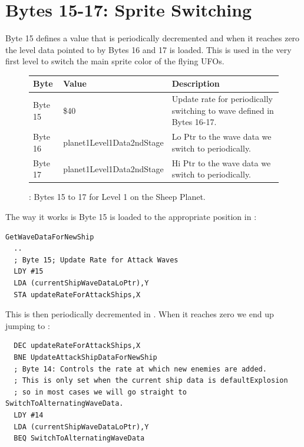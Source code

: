 \section{Bytes 15-17: Sprite Switching}
Byte 15 defines a value that is periodically decremented and when it reaches zero the level data pointed
to by Bytes 16 and 17 is loaded. This is used in the very first level to switch the main sprite color
of the flying UFOs. 

\begin{figure}[H]

  {
    \setlength{\tabcolsep}{3.0pt}
    \setlength\cmidrulewidth{\heavyrulewidth} %
    \begin{adjustbox}{width=13cm}

      \begin{tabular}{lll}
        \toprule
        Byte    & Value                     & Description                                                        \\
        \midrule
Byte 15 & \$40                       & Update rate for periodically switching to wave defined in Bytes 16-17. \\
 Byte 16 & planet1Level1Data2ndStage & Lo Ptr to the wave data we switch to periodically.               \\
 Byte 17 & planet1Level1Data2ndStage & Hi Ptr to the wave data we switch to periodically.               \\
        \bottomrule
      \end{tabular}
    \end{adjustbox}
  }\caption{: Bytes 15 to 17 for Level 1 on the Sheep Planet.}
\end{figure}

The way it works is Byte 15 is loaded to the appropriate position in :

\begin{lstlisting}
GetWaveDataForNewShip
  ..
  ; Byte 15; Update Rate for Attack Waves
  LDY #15
  LDA (currentShipWaveDataLoPtr),Y
  STA updateRateForAttackShips,X
\end{lstlisting}

This is then periodically decremented in . When it reaches zero we 
end up jumping to :
\begin{lstlisting}
  DEC updateRateForAttackShips,X
  BNE UpdateAttackShipDataForNewShip
  ; Byte 14: Controls the rate at which new enemies are added.
  ; This is only set when the current ship data is defaultExplosion
  ; so in most cases we will go straight to SwitchToAlternatingWaveData.
  LDY #14
  LDA (currentShipWaveDataLoPtr),Y
  BEQ SwitchToAlternatingWaveData
\end{lstlisting}

